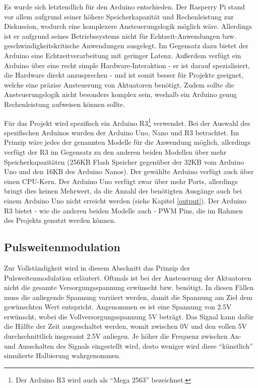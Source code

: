 Es wurde sich letztendlich für den Arduino entschieden.
Der Rasperry Pi stand vor allem aufgrund seiner höhere Speicherkapazität und Rechenleistung zur Diskussion, wodurch eine komplexere Ansteuerungslogik möglich wäre.
Allerdings ist er aufgrund seines Betriebssystems nicht für Echtzeit-Anwendungen bzw. geschwindigkeitskritische Anwendungen ausgelegt.
Im Gegensatz dazu bietet der Arduino eine Echtzeitverarbeitung mit geringer Latenz.
Außerdem verfügt ein Arduino über eine recht simple Hardware-Interaktion - er ist darauf spezialisiert, die Hardware direkt anzusprechen - und ist somit besser für Projekte geeignet, welche eine präzise Ansteuerung von Aktuatoren benötigt. %
Zudem sollte die Ansteuerungslogik nicht besonders komplex sein, weshalb ein Arduino genug Rechenleistung aufweisen können sollte.

Für das Projekt wird spezifisch ein Arduino R3\footnote{Der Arduino R3 wird auch als \enquote{Mega 2563} bezeichnet.} verwendet.
Bei der Auswahl des spezifischen Arduinos wurden der Arduino Uno, Nano und R3 betrachtet.
Im Prinzip wäre jedes der genannten Modelle für die Anwendung möglich, allerdings verfügt der R3 im Gegensatz zu den anderen beiden Modellen über mehr Speicherkapazitäten (256KB Flash Speicher
gegenüber der 32KB vom Arduino Uno und den 16KB des Arduino Nanos). Der gewählte Arduino verfügt auch über einen CPU-Kern.
Der Arduino Uno verfügt zwar über mehr Ports, allerdings bringt dies keinen Mehrwert, da die Anzahl der benötigten Ausgänge auch bei einem Arduino Uno nicht erreicht werden
(siehe Kapitel \ref{output}).
Der Arduino R3 bietet - wie die anderen beiden Modelle auch - \ac{PWM} Pins, die im Rahmen des Projekts genutzt werden können.

\subsection{Pulsweitenmodulation}\label{PWM}
Zur Vollständigkeit wird in diesem Abschnitt das Prinzip der Pulsweitenmodulation erläutert.
Oftmals ist bei der Ansteuerung der Aktuatoren nicht die gesamte Versorgungsspannung erwünscht bzw. benötigt.
In diesen Fällen muss die anliegende Spannung varriiert werden, damit die Spannung am Ziel dem gewünschten Wert entspricht.
Angenommen es ist eine Spannung von 2.5V erwünscht, wobei die Vollversorgungsspannung 5V beträgt.
Das Signal kann dafür die Hälfte der Zeit ausgeschaltet werden, womit zwischen 0V und den vollen 5V durchschnittlich insgesamt 2.5V anliegen.
Je höher die Frequenz zwischen An- und Ausschalten des Signals eingestellt wird, desto weniger wird diese \enquote{künstlich} simulierte Halbierung wahrgenommen.


